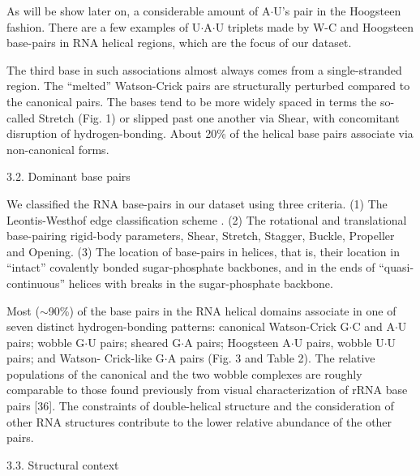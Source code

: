 As will be show later on, a considerable amount of A$\cdot$U's pair in
the Hoogsteen  fashion. There are a few  examples of U$\cdot$A$\cdot$U
triplets made by W-C and  Hoogsteen base-pairs in RNA helical regions,
which are the focus of our dataset.

The third base in such associations almost always comes from
a  single-stranded  region.  The  ``melted''  Watson-Crick  pairs  are
structurally perturbed compared to the canonical pairs. The bases tend
to be  more widely spaced in  terms the so-called Stretch  (Fig. 1) or
slipped  past one another  via Shear,  with concomitant  disruption of
hydrogen-bonding.  About 20\% of  the helical base pairs associate via
non-canonical forms.






3.2. Dominant base pairs

We classified the RNA base-pairs  in our dataset using three criteria.
(1) The Leontis-Westhof edge classification scheme \cite{leontis1998}.
(2)  The rotational  and translational  base-pairing  rigid-body
parameters,  Shear, Stretch, Stagger,  Buckle, Propeller  and Opening.
(3) The location of base-pairs  in helices, that is, their location in
``intact''  covalently bonded  sugar-phosphate backbones,  and  in the
ends   of   ``quasi-continuous''    helices   with   breaks   in   the
sugar-phosphate backbone.

Most  ($\sim$90\%)  of the  base  pairs  in  the RNA  helical  domains
associate  in   one  of  seven   distinct  hydrogen-bonding  patterns:
canonical Watson-Crick G$\cdot$C and A$\cdot$U pairs; wobble G$\cdot$U
pairs;  sheared  G$\cdot$A pairs;  Hoogsteen  A$\cdot$U pairs,  wobble
U$\cdot$U pairs;  and Watson- Crick-like  G$\cdot$A pairs (Fig.  3 and
Table 2). The relative populations of the canonical and the two wobble
complexes are roughly comparable to those found previously from visual
characterization  of   rRNA  base  pairs  [36].   The  constraints  of
double-helical structure and the consideration of other RNA structures
contribute to the lower relative abundance of the other pairs.

3.3. Structural context

